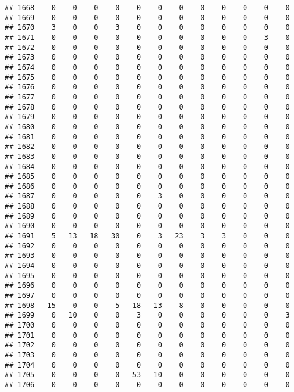 \documentclass[]{article}
\begin{document}
\begin{verbatim}
## 1668    0    0    0    0    0    0    0    0    0    0    0    0
## 1669    0    0    0    0    0    0    0    0    0    0    0    0
## 1670    3    0    0    3    0    0    0    0    0    0    0    0
## 1671    0    0    0    0    0    0    0    0    0    0    3    0
## 1672    0    0    0    0    0    0    0    0    0    0    0    0
## 1673    0    0    0    0    0    0    0    0    0    0    0    0
## 1674    0    0    0    0    0    0    0    0    0    0    0    0
## 1675    0    0    0    0    0    0    0    0    0    0    0    0
## 1676    0    0    0    0    0    0    0    0    0    0    0    0
## 1677    0    0    0    0    0    0    0    0    0    0    0    0
## 1678    0    0    0    0    0    0    0    0    0    0    0    0
## 1679    0    0    0    0    0    0    0    0    0    0    0    0
## 1680    0    0    0    0    0    0    0    0    0    0    0    0
## 1681    0    0    0    0    0    0    0    0    0    0    0    0
## 1682    0    0    0    0    0    0    0    0    0    0    0    0
## 1683    0    0    0    0    0    0    0    0    0    0    0    0
## 1684    0    0    0    0    0    0    0    0    0    0    0    0
## 1685    0    0    0    0    0    0    0    0    0    0    0    0
## 1686    0    0    0    0    0    0    0    0    0    0    0    0
## 1687    0    0    0    0    0    3    0    0    0    0    0    0
## 1688    0    0    0    0    0    0    0    0    0    0    0    0
## 1689    0    0    0    0    0    0    0    0    0    0    0    0
## 1690    0    0    0    0    0    0    0    0    0    0    0    0
## 1691    5   13   18   30    0    3   23    3    3    0    0    0
## 1692    0    0    0    0    0    0    0    0    0    0    0    0
## 1693    0    0    0    0    0    0    0    0    0    0    0    0
## 1694    0    0    0    0    0    0    0    0    0    0    0    0
## 1695    0    0    0    0    0    0    0    0    0    0    0    0
## 1696    0    0    0    0    0    0    0    0    0    0    0    0
## 1697    0    0    0    0    0    0    0    0    0    0    0    0
## 1698   15    0    0    5   18   13    8    0    0    0    0    0
## 1699    0   10    0    0    3    0    0    0    0    0    0    3
## 1700    0    0    0    0    0    0    0    0    0    0    0    0
## 1701    0    0    0    0    0    0    0    0    0    0    0    0
## 1702    0    0    0    0    0    0    0    0    0    0    0    0
## 1703    0    0    0    0    0    0    0    0    0    0    0    0
## 1704    0    0    0    0    0    0    0    0    0    0    0    0
## 1705    0    0    0    0   53   10    0    0    0    0    0    0
## 1706    0    0    0    0    0    0    0    0    0    0    0    0

\end{verbatim}
\end{document}
